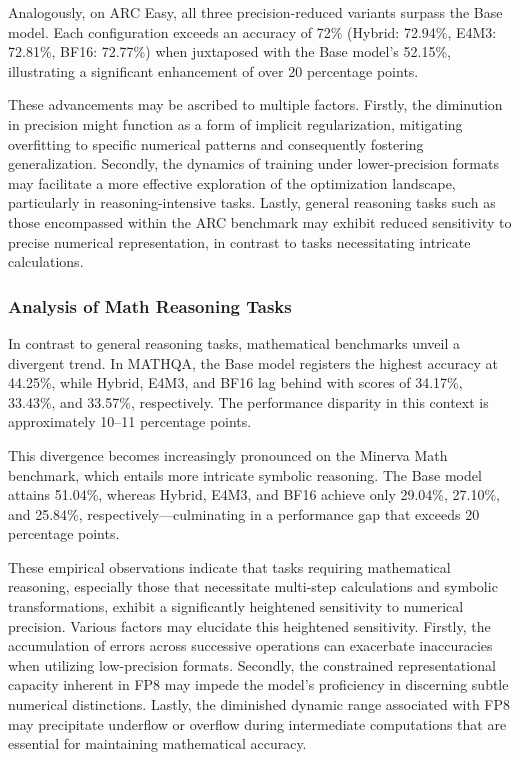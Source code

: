 Analogously, on ARC Easy, all three precision-reduced variants surpass the Base model. Each configuration exceeds an accuracy of 72\% (Hybrid: 72.94\%, E4M3: 72.81\%, BF16: 72.77\%) when juxtaposed with the Base model's 52.15\%, illustrating a significant enhancement of over 20 percentage points.

These advancements may be ascribed to multiple factors. Firstly, the diminution in precision might function as a form of implicit regularization, mitigating overfitting to specific numerical patterns and consequently fostering generalization. Secondly, the dynamics of training under lower-precision formats may facilitate a more effective exploration of the optimization landscape, particularly in reasoning-intensive tasks. Lastly, general reasoning tasks such as those encompassed within the ARC benchmark may exhibit reduced sensitivity to precise numerical representation, in contrast to tasks necessitating intricate calculations.

\subsubsection{Analysis of Math Reasoning Tasks}

In contrast to general reasoning tasks, mathematical benchmarks unveil a divergent trend. In MATHQA, the Base model registers the highest accuracy at 44.25\%, while Hybrid, E4M3, and BF16 lag behind with scores of 34.17\%, 33.43\%, and 33.57\%, respectively. The performance disparity in this context is approximately 10–11 percentage points.

This divergence becomes increasingly pronounced on the Minerva Math benchmark, which entails more intricate symbolic reasoning. The Base model attains 51.04\%, whereas Hybrid, E4M3, and BF16 achieve only 29.04\%, 27.10\%, and 25.84\%, respectively—culminating in a performance gap that exceeds 20 percentage points.


These empirical observations indicate that tasks requiring mathematical reasoning, especially those that necessitate multi-step calculations and symbolic transformations, exhibit a significantly heightened sensitivity to numerical precision. Various factors may elucidate this heightened sensitivity. Firstly, the accumulation of errors across successive operations can exacerbate inaccuracies when utilizing low-precision formats. Secondly, the constrained representational capacity inherent in FP8 may impede the model's proficiency in discerning subtle numerical distinctions. Lastly, the diminished dynamic range associated with FP8 may precipitate underflow or overflow during intermediate computations that are essential for maintaining mathematical accuracy.